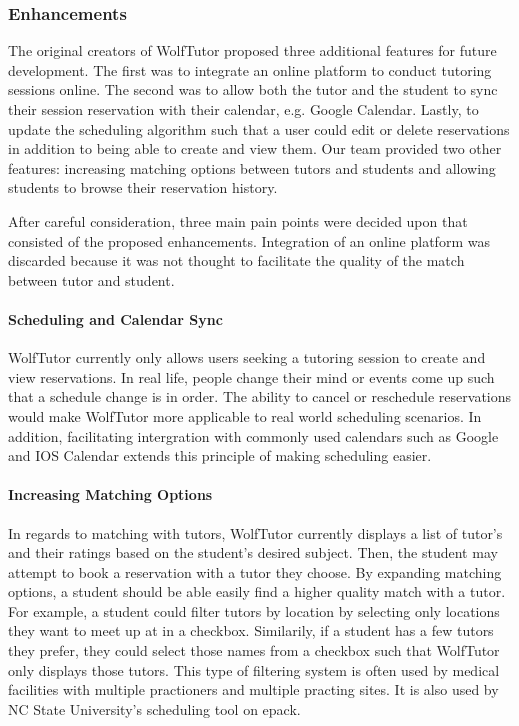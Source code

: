 
\label{sec:possible-enhancements} 

\subsubsection{Enhancements} 
The original creators of WolfTutor proposed
three additional features for future development. The first was to
integrate an online platform to conduct tutoring sessions online. The
second was to allow both the tutor and the student to sync their
session reservation with their calendar, e.g. Google Calendar. Lastly,
to update the scheduling algorithm such that a user could edit or
delete reservations in addition to being able to create and view
them. Our team provided two other features: increasing matching
options between tutors and students and allowing students to browse
their reservation history.

After careful consideration, three main pain points were decided upon
that consisted of the proposed enhancements. Integration of an online
platform was discarded because it was not thought to facilitate the
quality of the match between tutor and student.

\paragraph{Scheduling and Calendar Sync} WolfTutor currently only
allows users seeking a tutoring session to create and view
reservations. In real life, people change their mind or events come up
such that a schedule change is in order. The ability to cancel or
reschedule reservations would make WolfTutor more applicable to real
world scheduling scenarios. In addition, facilitating intergration
with commonly used calendars such as Google and IOS Calendar extends
this principle of making scheduling easier.

\paragraph{Increasing Matching Options} In regards to matching with
tutors, WolfTutor currently displays a list of tutor's and their
ratings based on the student's desired subject. Then, the student may
attempt to book a reservation with a tutor they choose. By expanding
matching options, a student should be able easily find a higher
quality match with a tutor. For example, a student could filter tutors
by location by selecting only locations they want to meet up at in a
checkbox. Similarily, if a student has a few tutors they prefer, they
could select those names from a checkbox such that WolfTutor only
displays those tutors. This type of filtering system is often used by
medical facilities with multiple practioners and multiple practing
sites. It is also used by NC State University's scheduling tool on
epack.

